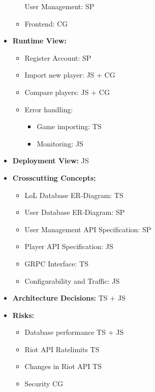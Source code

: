 \begin{itemize}
\begin{itemize}
	User Management: SP
	\item 
	Frontend: CG
\end{itemize}
\item
\textbf{Runtime View:}
\begin{itemize}
	\item
	Register Account: SP
	\item
	Import new player: JS + CG
	\item
	Compare players: JS + CG
	\item
	Error handling:
	\begin{itemize}
		\item
		Game importing: TS
		\item
		Monitoring: JS
	\end{itemize}
\end{itemize}
\item
\textbf{Deployment View:} JS
\item
\textbf{Crosscutting Concepts:}
\begin{itemize}
	\item
	LoL Database ER-Diagram: TS
	\item
	User Database ER-Diagram: SP
	\item
	User Management API Specification: SP
	\item
	Player API Specification: JS
	\item
	GRPC Interface: TS
	\item
	Configurability and Traffic: JS
\end{itemize}
\item
\textbf{Architecture Decisions:} TS + JS
\item
\textbf{Risks:}
\begin{itemize}
	\item
	Database performance TS + JS
	\item
	Riot API Ratelimits TS
	\item
	Changes in Riot API TS
	\item
	Security CG
\end{itemize}
\end{itemize}